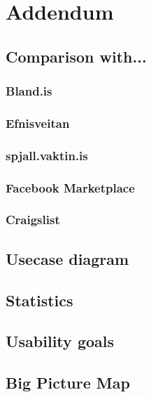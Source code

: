 \section{Addendum}

\subsection{Comparison with...}
\subsubsection{Bland.is}
\subsubsection{Efnisveitan}
\subsubsection{spjall.vaktin.is}
\subsubsection{Facebook Marketplace}
\subsubsection{Craigslist}

\subsection{Usecase diagram}

\subsection{Statistics}

\subsection{Usability goals}

\subsection{Big Picture Map}
